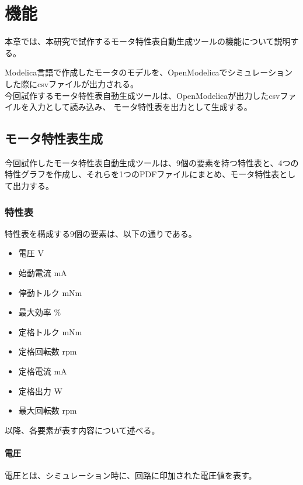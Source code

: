 \chapter{機能}\label{cha:Function}
本章では、本研究で試作するモータ特性表自動生成ツールの機能について説明する。

Modelica言語で作成したモータのモデルを、OpenModelicaでシミュレーションした際にcsvファイルが出力される。\\
今回試作するモータ特性表自動生成ツールは、OpenModelicaが出力したcsvファイルを入力として読み込み、
モータ特性表を出力として生成する。
\section{モータ特性表生成}\label{kenkyu_mokuteki}
今回試作したモータ特性表自動生成ツールは、9個の要素を持つ特性表と、4つの特性グラフを作成し、それらを1つのPDFファイルにまとめ、モータ特性表として出力する。
\subsection{特性表}\label{sub:tokuseihyou}
特性表を構成する9個の要素は、以下の通りである。
\begin{itemize}
	\item 電圧 V
	\item 始動電流 mA
	\item 停動トルク mNm
	\item 最大効率 \%
	\item 定格トルク mNm 
	\item 定格回転数 rpm
	\item 定格電流 mA
	\item 定格出力 W
	\item 最大回転数 rpm 
\end{itemize}

以降、各要素が表す内容について述べる。
\subsubsection{電圧}\label{sub:sub:dennatu}
電圧とは、シミュレーション時に、回路に印加された電圧値を表す。

